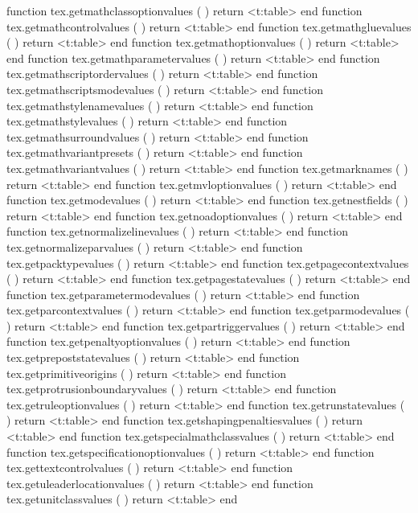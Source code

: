 function tex.getmathclassoptionvalues     ( ) return <t:table> end
function tex.getmathcontrolvalues         ( ) return <t:table> end
function tex.getmathgluevalues            ( ) return <t:table> end
function tex.getmathoptionvalues          ( ) return <t:table> end
function tex.getmathparametervalues       ( ) return <t:table> end
function tex.getmathscriptordervalues     ( ) return <t:table> end
function tex.getmathscriptsmodevalues     ( ) return <t:table> end
function tex.getmathstylenamevalues       ( ) return <t:table> end
function tex.getmathstylevalues           ( ) return <t:table> end
function tex.getmathsurroundvalues        ( ) return <t:table> end
function tex.getmathvariantpresets        ( ) return <t:table> end
function tex.getmathvariantvalues         ( ) return <t:table> end
function tex.getmarknames                 ( ) return <t:table> end
function tex.getmvloptionvalues           ( ) return <t:table> end
function tex.getmodevalues                ( ) return <t:table> end
function tex.getnestfields                ( ) return <t:table> end
function tex.getnoadoptionvalues          ( ) return <t:table> end
function tex.getnormalizelinevalues       ( ) return <t:table> end
function tex.getnormalizeparvalues        ( ) return <t:table> end
function tex.getpacktypevalues            ( ) return <t:table> end
function tex.getpagecontextvalues         ( ) return <t:table> end
function tex.getpagestatevalues           ( ) return <t:table> end
function tex.getparametermodevalues       ( ) return <t:table> end
function tex.getparcontextvalues          ( ) return <t:table> end
function tex.getparmodevalues             ( ) return <t:table> end
function tex.getpartriggervalues          ( ) return <t:table> end
function tex.getpenaltyoptionvalues       ( ) return <t:table> end
function tex.getprepoststatevalues        ( ) return <t:table> end
function tex.getprimitiveorigins          ( ) return <t:table> end
function tex.getprotrusionboundaryvalues  ( ) return <t:table> end
function tex.getruleoptionvalues          ( ) return <t:table> end
function tex.getrunstatevalues            ( ) return <t:table> end
function tex.getshapingpenaltiesvalues    ( ) return <t:table> end
function tex.getspecialmathclassvalues    ( ) return <t:table> end
function tex.getspecificationoptionvalues ( ) return <t:table> end
function tex.gettextcontrolvalues         ( ) return <t:table> end
function tex.getuleaderlocationvalues     ( ) return <t:table> end
function tex.getunitclassvalues           ( ) return <t:table> end
\stoptyping

\stopsubsection

